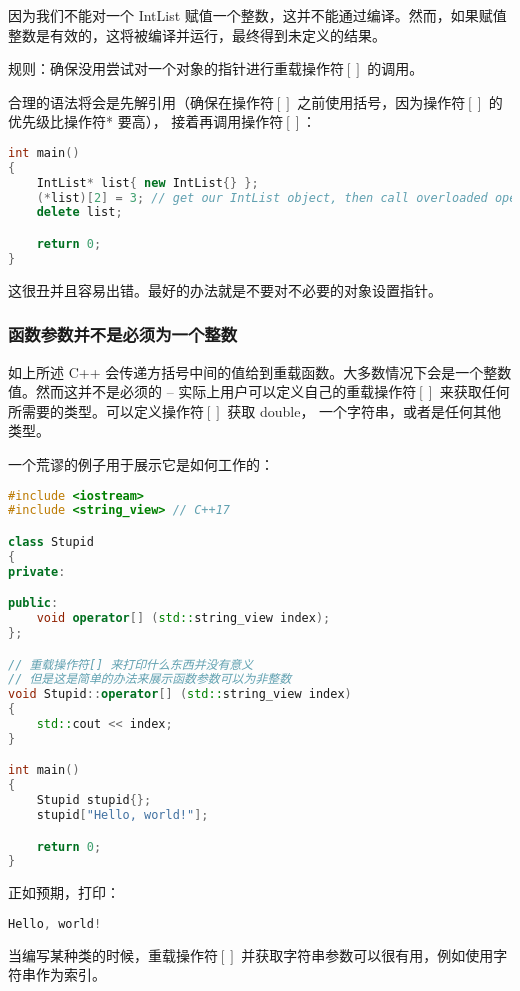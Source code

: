 \documentclass[../../LearnCpp.tex]{subfiles}
\begin{document}
因为我们不能对一个 IntList 赋值一个整数，这并不能通过编译。然而，如果赋值整数是有效的，这将被编译并运行，最终得到未定义的结果。

规则：确保没用尝试对一个对象的指针进行重载操作符$\left[\right]$ 的调用。

合理的语法将会是先解引用（确保在操作符$\left[\right]$ 之前使用括号，因为操作符$\left[\right]$ 的优先级比操作符* 要高），
接着再调用操作符$\left[\right]$：

\begin{lstlisting}[language=C++]
int main()
{
    IntList* list{ new IntList{} };
    (*list)[2] = 3; // get our IntList object, then call overloaded operator[]
    delete list;

    return 0;
}
\end{lstlisting}

这很丑并且容易出错。最好的办法就是不要对不必要的对象设置指针。

\subsubsection*{函数参数并不是必须为一个整数}

如上所述 C++ 会传递方括号中间的值给到重载函数。大多数情况下会是一个整数值。然而这并不是必须的 --
实际上用户可以定义自己的重载操作符$\left[\right]$ 来获取任何所需要的类型。可以定义操作符$\left[\right]$ 获取 double，
一个字符串，或者是任何其他类型。

一个荒谬的例子用于展示它是如何工作的：

\begin{lstlisting}[language=C++]
#include <iostream>
#include <string_view> // C++17

class Stupid
{
private:

public:
	void operator[] (std::string_view index);
};

// 重载操作符[] 来打印什么东西并没有意义
// 但是这是简单的办法来展示函数参数可以为非整数
void Stupid::operator[] (std::string_view index)
{
	std::cout << index;
}

int main()
{
	Stupid stupid{};
	stupid["Hello, world!"];

	return 0;
}
\end{lstlisting}

正如预期，打印：

\begin{lstlisting}[language=C++]
Hello, world!
\end{lstlisting}

当编写某种类的时候，重载操作符$\left[\right]$ 并获取字符串参数可以很有用，例如使用字符串作为索引。
\end{document}

